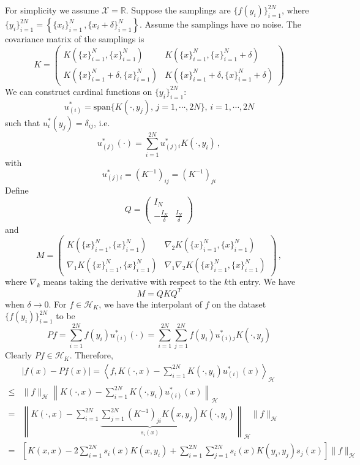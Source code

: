 \documentclass[a4paper,onecolumn]{article}
\begin{document}
\noindent For simplicity we assume $\mathcal{X}=\mathbb{R}$.
Suppose the samplings are $\{f(y_i)\}_{i=1}^{2N}$, where $\{y_i\}_{i=1}^{2N} = \left\{\{x_i\}_{i=1}^N\,, \{x_i + \delta\}_{i=1}^N\right\}$.
Assume the samplings have no noise.
The covariance matrix of the samplings is
$$
    K = \begin{pmatrix}
        K(\{x\}_{i=1}^N, \{x\}_{i=1}^N) & K(\{x\}_{i=1}^N, \{x\}_{i=1}^N+\delta)\\
        K(\{x\}_{i=1}^N+\delta, \{x\}_{i=1}^N) & K(\{x\}_{i=1}^N+\delta, \{x\}_{i=1}^N+\delta)
    \end{pmatrix}
$$
We can construct cardinal functions on $\{y_i\}_{i=1}^{2N}$:
$$
    u_{(i)}^* = \textrm{span}\{K(\cdot, y_j),\, j=1,\cdots,2N\},\, i=1,\cdots, 2N
$$
such that $u_{i}^*(y_j) = \delta_{ij}$, i.e.
$$
    u_{(j)}^*(\cdot) = \sum_{i=1}^{2N} u_{(j)i}^* K(\cdot, y_i)\,,
$$
with
$$
    u_{(j)i}^* = \left(K^{-1}\right)_{ij} = \left(K^{-1}\right)_{ji}
$$
Define 
$$
    Q = \begin{pmatrix}
        I_N & \\
        -\frac{I_N}{\delta} & \frac{I_N}{\delta}
    \end{pmatrix}
$$
and 
$$
    M = \begin{pmatrix}
        K(\{x\}_{i=1}^N, \{x\}_{i=1}^N) & \nabla_2 K(\{x\}_{i=1}^N, \{x\}_{i=1}^N)\\
        \nabla_1 K(\{x\}_{i=1}^N, \{x\}_{i=1}^N) & \nabla_1 \nabla_2 K(\{x\}_{i=1}^N, \{x\}_{i=1}^N)
    \end{pmatrix}\,,
$$
where $\nabla_k$ means taking the derivative with respect to the $k$th entry.
We have
$$
    M = Q K Q^T
$$
when $\delta\rightarrow 0$.
For $f\in \mathcal{H}_K $, we have the interpolant of $f$ on the dataset $\{f(y_i)\}_{i=1}^{2N}$ to be
$$
    Pf = \sum_{i=1}^{2N} f(y_i) u_{(i)}^*(\cdot) = \sum_{i=1}^{2N} \sum_{j=1}^{2N} f(y_i) u_{(i)j}^* K(\cdot, y_j)
$$
Clearly $Pf \in \mathcal{H}_K$.
Therefore,
\begin{equation*}\begin{split}
    &\left|f(x) - Pf(x)\right| = \left<f, K(\cdot, x) - \sum_{i=1}^{2N} K(\cdot, y_i) u_{(i)}^*(x)\right>_\mathcal{H}\\
    \le& \|f\|_\mathcal{H} \left\|K(\cdot, x) - \sum_{i=1}^{2N} K(\cdot, y_i) u_{(i)}^*(x)\right\|_\mathcal{H}\\
    =& \left\| K(\cdot, x) - \sum_{i=1}^{2N}\underbrace{\sum_{j=1}^{2N} (K^{-1})_{ji} K(x, y_j)}_{s_i(x)} K(\cdot, y_i) \right\|_\mathcal{H} \|f\|_\mathcal{H}\\
    =& \left[K(x,x) - 2 \sum_{i=1}^{2N} s_i(x) K(x,y_i) + \sum_{i=1}^{2N} \sum_{j=1}^{2N} s_i(x) K(y_i, y_j) s_j(x) \right] \|f\|_\mathcal{H}
\end{split}\end{equation*}
\end{document}

